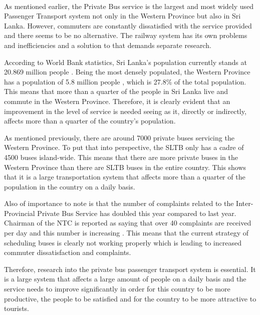 \paragraph{} As mentioned earlier, the Private Bus service is the largest and most widely used Passenger Transport system not only in the Western Province but also in Sri Lanka. However, commuters are constantly dissatisfied with the service provided and there seems to be no alternative. The railway system has its own problems and inefficiencies and a solution to that demands separate research.

According to World Bank statistics, Sri Lanka's population currently stands at 20.869 million people \cite{WorldBank2013}. Being the most densely populated, the Western Province has a population of 5.8 million people \cite{DepartmentofCensusandStatistics2012}, which is 27.8\% of the total population. This means that more than a quarter of the people in Sri Lanka live and commute in the Western Province. Therefore, it is clearly evident that an improvement in the level of service is needed seeing as it, directly or indirectly, affects more than a quarter of the country's population.

As mentioned previously, there are around 7000 private buses servicing the Western Province. To put that into perspective, the SLTB only has a cadre of 4500 buses island-wide. This means that there are more private buses in the Western Province than there are SLTB buses in the entire country. This shows that it is a large transportation system that affects more than a quarter of the population in the country on a daily basis.

Also of importance to note is that the number of complaints related to the Inter-Provincial Private Bus Service has doubled this year compared to last year. Chairman of the NTC is reported as saying that over 40 complaints are received per day and this number is increasing \cite{Wickremasekara2012, Range2012}. This means that the current strategy of scheduling buses is clearly not working properly which is leading to increased commuter dissatisfaction and complaints.

Therefore, research into the private bus passenger transport system is essential. It is a large system that affects a large amount of people on a daily basis and the service needs to improve significantly in order for this country to be more productive, the people to be satisfied and for the country to be more attractive to tourists.




